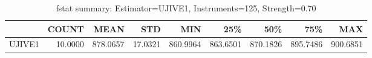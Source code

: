 \begin{table}[ht]
\centering
\caption{fstat summary: Estimator=UJIVE1, Instruments=125, Strength=0.70}
\begin{tabular}{lrrrrrrrr}
\toprule
 & COUNT & MEAN & STD & MIN & 25\% & 50\% & 75\% & MAX \\
\midrule
UJIVE1 & 10.0000 & 878.0657 & 17.0321 & 860.9964 & 863.6501 & 870.1826 & 895.7486 & 900.6851 \\
\bottomrule
\end{tabular}
\end{table}
